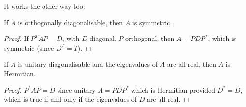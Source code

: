 \documentclass[10pt, a4paper]{article}
\begin{document}
It works the other way too:

\begin{proposition}
    If $A$ is orthogonally diagonalisable,
    then $A$ is symmetric.

    \begin{proof}
        If $P ^ TAP = D$,
        with $D$ diagonal,
        $P$ orthogonal,
        then $A = PDP ^ T$,
        which is symmetric
        (since $D ^ T = T$).
    \end{proof}
\end{proposition}

\begin{proposition}
    If $A$ is unitary diagonalisable and the eigenvalues of $A$ are all real,
    then $A$ is Hermitian.

    \begin{proof}
        $P ^ {*}AP = D$ since unitary $A = PDP ^ {*}$ which is Hermitian provided $D ^ {*} = D$,
        which is true if and only if the eigenvalues of $D$ are all real.
    \end{proof}
\end{proposition}
\end{document}
